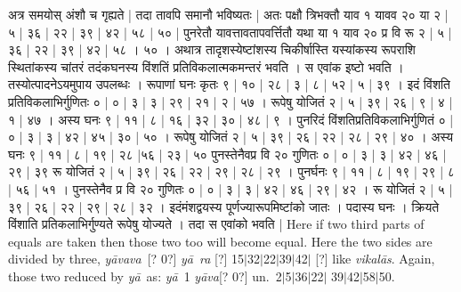 \documentclass[11pt,a5paper]{book}
\def\ya{\textit{y\=a}}
\def\yava{\textit{y\=ava}}
\def\yavava{\textit{y\=avava}}
\def\vikalas{\textit{vi\-ka\-l\=as}}
\def\danda{$|$}
\begin{document}
{\newpage
{\s अत्र समयोस् अंशौ च गृह्यते | तदा तावपि
समानौ भविष्यतः | अतः पक्षौ त्रिभक्तौ याव १ यावव २० 
या २ | ५ | ३६ | २२ | ३९ | ४२ | ५८ | ५० | 
पुनरेतौ यावत्तावतापवर्त्तितौ यथा या १
याव २० प्र वि रू २ | ५ | ३६ | २२ | ३९ | ४२ | ५८ । ५० । 
अथात्र तादृशस्येष्टांशस्य चिकीर्षास्ति यस्यांकस्य रूपराशि
स्थितांकस्य चांतरं तदंकघनस्य विंशतिं 
प्रतिविकलात्मकमन्तरं भवति । स एवांक इष्टो भवति । तस्योत्पादनेऽयमुपाय उपलब्धः । रूपाणां घनः कृतः ९ | १० | २८ | ३ | ८ | ५२ | ५ | ३९ ।
इदं विंशति प्रतिविकलाभिर्गुणितः ० | ० | ३ | ३ | २९ | २१ | २ | ५७ । 
रूपेषु योजितं २ | ५ | ३९ | २६ | ९ | ४ | १ | ४७ । अस्य घनः ९ | ११ | ८ | १६ | ३२ | ३० | ४८ | ९ । 
पुनरिदं विंशतिप्रतिविकलाभिर्गुणितं ० | ० | ३ | ३ | ४२ | ४५ | ३० | ५० । 
रूपेषु योजितं २ | ५ | ३९ | २६ | २२ | २८ | २९ | ४० । अस्य घनः 
९ | ११ | ८ | १९ | २८ |५६ | २३ | ५० पुनस्तेनैवप्र वि
२० गुणितः ० | ० | ३ | ३ | ४२ | ४६ | २९ | ३९
रू योजितं २ | ५ | ३९ | २६ | २२ | २९ | २८ | २९ । पुनर्घनः ९ | ११ | ८ | १९ | २९ | ८ | ५६ | ५१ । 
पुनस्तेनैव प्र वि २० गुणितः ० | ० | ३ | ३ | ४२ | ४६ | २९ | ४२ ।
रू योजितं २ | ५ | ३९ | २६ | २२ | २९ | २८ | ३२ ।
इदंमंशद्वयस्य पूर्णज्यारूपमिष्टांको जातः । पदास्य घनः । क्रियते विंशाति प्रतिकलाभिर्गुण्यते
रूपेषु योज्यते । तदा स एवांको भवति | }
\newpage
Here if two third parts of equals are taken then those two too will become equal.   Here the two sides
are divided by three, \yavava\ [? 0?] \ya\ \textit{ra} [?] 15\danda 32\danda 22\danda 39\danda 42\danda
[?] like \vikalas.
Again, those two reduced by \ya\ as: \ya\ 1 \yava [? 0?] un.\ 2\danda 5\danda 36\danda 22\danda 
39\danda 42\danda 58\danda 50. 

}
\end{document}
